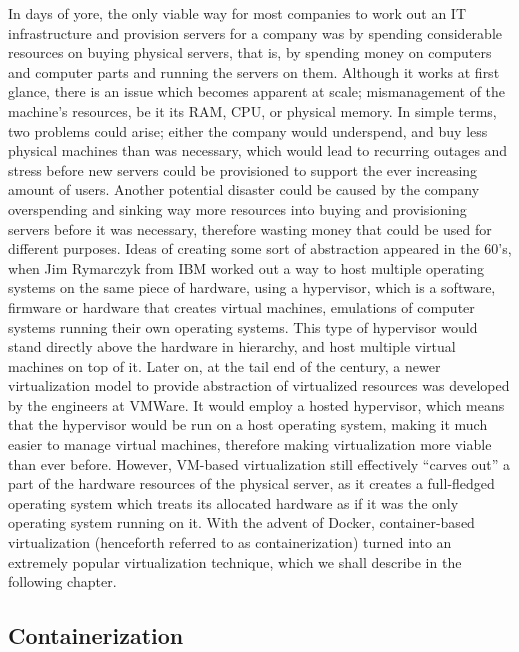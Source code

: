 \documentclass[thesis=B,english]{FITthesis}[2019/12/23]
\begin{document}
In days of yore, the only viable way for most companies to work out an IT infrastructure and provision servers for a company was by spending considerable resources on buying physical servers, that is, by spending money on computers and computer parts and running the servers on them. Although it works at first glance, there is an issue which becomes apparent at scale; mismanagement of the machine’s resources, be it its RAM, CPU, or physical memory. In simple terms, two problems could arise; either the company would underspend, and buy less physical machines than was necessary, which would lead to recurring outages and stress before new servers could be provisioned to support the ever increasing amount of users. Another potential disaster could be caused by the company overspending and sinking way more resources into buying and provisioning servers before it was necessary, therefore wasting money that could be used for different purposes.
\newline
Ideas of creating some sort of abstraction appeared in the 60’s, when Jim Rymarczyk from IBM worked out a way to host multiple operating systems on the same piece of hardware, using a hypervisor, which is a software, firmware or hardware that creates virtual machines, emulations of computer systems running their own operating systems. This type of hypervisor would stand directly above the hardware in hierarchy, and host multiple virtual machines on top of it. \cite{virtualization}
\newline
Later on, at the tail end of the century, a newer virtualization model to provide abstraction of virtualized resources was developed by the engineers at VMWare. \cite{vmware} It would employ a hosted hypervisor, which means that the hypervisor would be run on a host operating system, making it much easier to manage virtual machines, therefore making virtualization more viable than ever before. \cite{virtualization}
\newline
However, VM-based virtualization still effectively “carves out” a part of the hardware resources of the physical server, as it creates a full-fledged operating system which treats its allocated hardware as if it was the only operating system running on it.
\newline
With the advent of Docker, container-based virtualization (henceforth referred to as containerization) turned into an extremely popular virtualization technique, which we shall describe in the following chapter. 


\subsection{Containerization}
\end{document}
